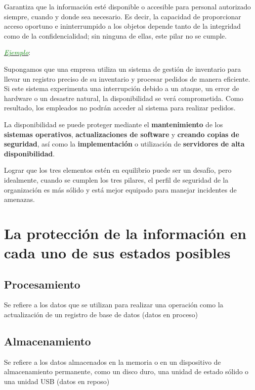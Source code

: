 \documentclass[a4paper]{article} %
\begin{document}
        Garantiza que la información esté disponible o accesible para personal autorizado siempre, cuando y donde sea necesario. Es decir, la capacidad de proporcionar acceso oportuno e ininterrumpido a los objetos depende tanto de la integridad como de la confidencialidad; sin ninguna de ellas, este pilar no se cumple.

        \underline{\textit{\textcolor{green}{Ejemplo}}}: 

        Supongamos que una empresa utiliza un sistema de gestión de inventario para llevar un registro preciso de su inventario y procesar pedidos de manera eficiente. Si este sistema experimenta una interrupción debido a un ataque, un error de hardware o un desastre natural, la disponibilidad se verá comprometida. Como resultado, los empleados no podrán acceder al sistema para realizar pedidos.

        La disponibilidad se puede proteger mediante el \textbf{mantenimiento} de los \textbf{sistemas operativos}, \textbf{actualizaciones de software} y \textbf{creando copias de seguridad}, así como la \textbf{implementación} o utilización de \textbf{servidores de alta disponibilidad}.
        
    Lograr que los tres elementos estén en equilibrio puede ser un desafío, pero idealmente, cuando se cumplen los tres pilares, el perfil de seguridad de la organización es más sólido y está mejor equipado para manejar incidentes de amenazas.

\section{La protección de la información en cada uno de sus estados posibles}  

    \subsection{Procesamiento}

    Se refiere a los datos que se utilizan para realizar una operación como la actualización de un registro de base de datos (datos en proceso)

    \subsection{Almacenamiento}

    Se refiere a los datos almacenados en la memoria o en un dispositivo de almacenamiento permanente, como un disco duro, una unidad de estado sólido o una unidad USB (datos en reposo)
\end{document}

